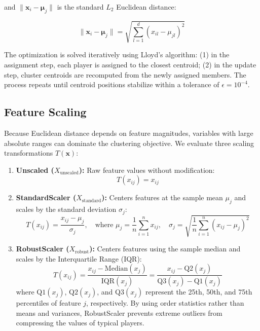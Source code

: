 \documentclass[12pt]{ai_conquer2026}
\begin{document}
and $\|\mathbf{x}_i - \boldsymbol{\mu}_j\|$ is the standard $L_2$ Euclidean distance:

\begin{equation}
\|\mathbf{x}_i - \boldsymbol{\mu}_j\| = \sqrt{\sum_{l=1}^{d} (x_{il} - \mu_{jl})^2}
\end{equation}

The optimization is solved iteratively using Lloyd's algorithm: (1) in the assignment step, each player is assigned to the closest centroid; (2) in the update step, cluster centroids are recomputed from the newly assigned members. The process repeats until centroid positions stabilize within a tolerance of $\epsilon = 10^{-4}$.

\subsection{Feature Scaling}
Because Euclidean distance depends on feature magnitudes, variables with large absolute ranges can dominate the clustering objective. We evaluate three scaling transformations $T(\mathbf{x})$:

\begin{enumerate}
  \item \textbf{Unscaled ($X_{\text{unscaled}}$):} Raw feature values without modification:
  \begin{equation}
  T(x_{ij}) = x_{ij}
  \end{equation}
  \item \textbf{StandardScaler ($X_{\text{standard}}$):} Centers features at the sample mean $\mu_j$ and scales by the standard deviation $\sigma_j$:
  \begin{equation}
  T(x_{ij}) = \frac{x_{ij} - \mu_j}{\sigma_j}, \quad \text{where } \mu_j = \frac{1}{n}\sum_{i=1}^{n} x_{ij}, \quad \sigma_j = \sqrt{\frac{1}{n}\sum_{i=1}^{n} (x_{ij} - \mu_j)^2}
  \end{equation}
  \item \textbf{RobustScaler ($X_{\text{robust}}$):} Centers features using the sample median and scales by the Interquartile Range (IQR):
  \begin{equation}
  T(x_{ij}) = \frac{x_{ij} - \text{Median}(x_j)}{\text{IQR}(x_j)} = \frac{x_{ij} - \text{Q2}(x_j)}{\text{Q3}(x_j) - \text{Q1}(x_j)}
  \end{equation}
  where $\text{Q1}(x_j)$, $\text{Q2}(x_j)$, and $\text{Q3}(x_j)$ represent the 25th, 50th, and 75th percentiles of feature $j$, respectively. By using order statistics rather than means and variances, RobustScaler prevents extreme outliers from compressing the values of typical players.
\end{enumerate}
\end{document}
